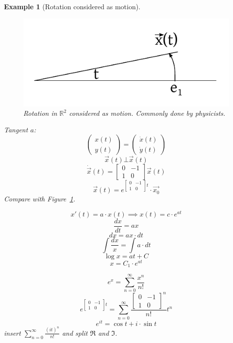 \documentclass[a4paper]{article}
\numberwithin{lecref}{section}
\newtheorem*{Example}{Example}
\newcommand{\vectwo}[2]{\begin{pmatrix} #1 \\ #2 \end{pmatrix}}
\begin{document}
\begin{Example}[Rotation considered as motion]
  \begin{figure}[t]
    \begin{center}
      \includegraphics{img/14_rotation_as_motion.pdf}
      \caption{Rotation in $\mathbb R^2$ considered as motion. Commonly done by physicists.}
      \label{img:rotr2mot}
    \end{center}
  \end{figure}

  Tangent $a$:
  \[ \vectwo{x(t)}{y(t)} = \vectwo{\dot{x}(t)}{\dot{y}(t)} \]
  \[ \vec x(t) \bot \vec{x}(t) \]
  \[ \dot{\vec{x}}(t) = \begin{bmatrix} 0 & -1 \\ 1 & 0 \end{bmatrix} \vec{x}(t) \]
  \[ \vec{x}(t) = e^{\begin{bmatrix} 0 & -1 \\ 1 & 0 \end{bmatrix} t} \cdot \vec{x_0} \]
  Compare with Figure~\ref{img:rotr2mot}.

  \[ x'(t) = a\cdot x(t) \implies x(t) = c \cdot e^{at} \]
  \[ \frac{dx}{dt} = ax \]
  \[ dx = ax \cdot dt \]
  \[ \int \frac{dx}{x} = \int a \cdot dt \]
  \[ \log{x} = at + C \]
  \[ x = C_1 \cdot e^{at} \]

  \[ e^x = \sum_{n=0}^\infty \frac{x^n}{n!} \]
  \[ e^{\begin{bmatrix} 0 & -1 \\ 1 & 0 \end{bmatrix}t} = \sum_{n=0}^\infty \frac{\begin{bmatrix} 0 & -1 \\ 1 & 0 \end{bmatrix}^n}{n!} t^n \]
  \[ e^{it} = \cos{t} + i \cdot \sin{t} \]
  insert $\sum_{n=0}^\infty \frac{(it)^n}{n!}$ and split $\Re$ and $\Im$.


\end{Example}
\end{document}
